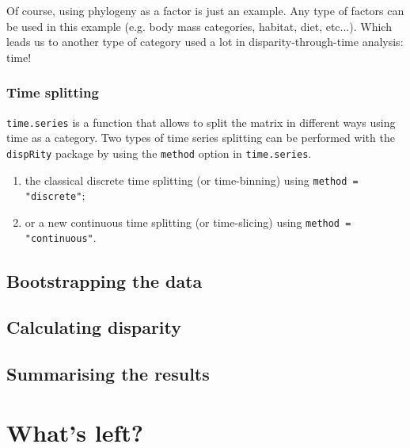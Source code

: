 \documentclass{article}\usepackage[]{graphicx}\usepackage[]{color}
\newcommand{\dispRity}{\texttt{dispRity} }
\begin{document}
Of course, using phylogeny as a factor is just an example.
Any type of factors can be used in this example (e.g. body mass categories, habitat, diet, etc...).
Which leads us to another type of category used a lot in disparity-through-time analysis: time!

\subsubsection{Time splitting}
\texttt{time.series} is a function that allows to split the matrix in different ways using time as a category.
Two types of time series splitting can be performed with the \dispRity package by using the \texttt{method} option in \texttt{time.series}.
\begin{enumerate}
\item the classical discrete time splitting (or time-binning) using \texttt{method = "discrete"};
\item or a new continuous time splitting (or time-slicing) using \texttt{method = "continuous"}.
\end{enumerate}


\subsection{Bootstrapping the data}

\subsection{Calculating disparity}

\subsection{Summarising the results}

\section{What's left?}
\label{whatsleft}
\end{document}

